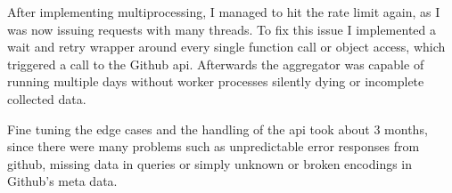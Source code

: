 After implementing multiprocessing, I managed to hit the rate limit again, as I was now issuing requests with many threads.
To fix this issue I implemented a wait and retry wrapper around every single function call or object access, which triggered a call to the Github \ac{api}.
Afterwards the aggregator was capable of running multiple days without worker processes silently dying or incomplete collected data.

Fine tuning the edge cases and the handling of the \ac{api} took about 3 months, since there were many problems such as unpredictable error responses from github, missing data in queries or simply unknown or broken encodings in Github's meta data.

